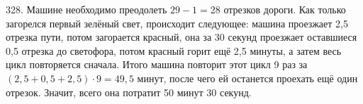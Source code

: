 328. Машине необходимо преодолеть $29-1=28$ отрезков  дороги. Как только загорелся первый зелёный свет, происходит следующее: машина проезжает 2,5 отрезка пути, потом загорается красный, она за 30 секунд проезжает оставшиеся 0,5 отрезка до светофора, потом красный горит ещё 2,5 минуты, а затем весь цикл повторяется сначала. Итого машина повторит этот цикл 9 раз за $(2,5+0,5+2,5)\cdot9=49,5$ минут, после чего ей останется проехать ещё один отрезок. Значит, всего она потратит 50 минут 30 секунд.\\
